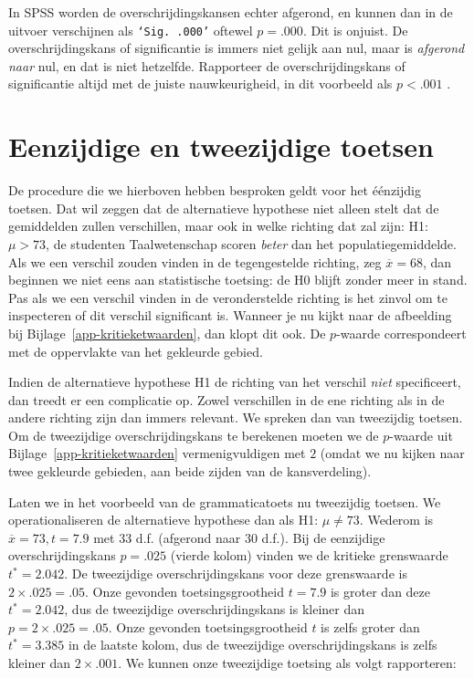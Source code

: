 \documentclass[
]{book}
\begin{document}
In SPSS worden de overschrijdingskansen echter afgerond, en kunnen dan
in de uitvoer verschijnen als \texttt{‘Sig.\ .000’} oftewel \(p=.000\). Dit is
onjuist. De overschrijdingskans of significantie is immers niet gelijk
aan nul, maar is \emph{afgerond naar} nul, en dat is niet hetzelfde.
Rapporteer de overschrijdingskans of significantie altijd met de juiste
nauwkeurigheid, in dit voorbeeld als \(p<.001\) \citep[zie ook][
p.125]{Wright03}.

\section{Eenzijdige en tweezijdige toetsen}\label{sec:ttoets-eenzijdigtweezijdig}

De procedure die we hierboven hebben besproken geldt voor het éénzijdig
toetsen. Dat wil zeggen dat de alternatieve hypothese niet alleen stelt
dat de gemiddelden zullen verschillen, maar ook in welke richting dat
zal zijn: H1: \(\mu >73\), de studenten Taalwetenschap scoren \emph{beter} dan
het populatiegemiddelde. Als we een verschil zouden vinden in de
tegengestelde richting, zeg \(\overline{x}=68\), dan beginnen we niet eens
aan statistische toetsing: de H0 blijft zonder meer in stand. Pas als we
een verschil vinden in de veronderstelde richting is het zinvol om te
inspecteren of dit verschil significant is. Wanneer je nu kijkt naar de
afbeelding bij Bijlage~\ref{app-kritieketwaarden}, dan klopt dit ook.
De \(p\)-waarde correspondeert met de oppervlakte van het gekleurde
gebied.

Indien de alternatieve hypothese H1 de richting van het verschil \emph{niet}
specificeert, dan treedt er een complicatie op. Zowel verschillen in de
ene richting als in de andere richting zijn dan immers relevant. We
spreken dan van tweezijdig toetsen. Om de tweezijdige
overschrijdingskans te berekenen moeten we de \(p\)-waarde uit
Bijlage~\ref{app-kritieketwaarden} vermenigvuldigen met \(2\) (omdat we
nu kijken naar twee gekleurde gebieden, aan beide zijden van de
kansverdeling).

Laten we in het voorbeeld van de grammaticatoets nu tweezijdig toetsen.
We operationaliseren de alternatieve hypothese dan als H1: \(\mu \ne 73\).
Wederom is \(\overline{x}=73, t=7.9\) met 33 d.f. (afgerond naar 30 d.f.).
Bij de eenzijdige overschrijdingskans \(p=.025\) (vierde kolom) vinden we
de kritieke grenswaarde \(t^*=2.042\). De tweezijdige overschrijdingskans
voor deze grenswaarde is \(2 \times .025 = .05\). Onze gevonden
toetsingsgrootheid \(t=7.9\) is groter dan deze \(t^*=2.042\), dus de
tweezijdige overschrijdingskans is kleiner dan \(p=2\times.025=.05\). Onze
gevonden toetsingsgrootheid \(t\) is zelfs groter dan \(t^*=3.385\) in de
laatste kolom, dus de tweezijdige overschrijdingskans is zelfs kleiner
dan \(2\times.001\). We kunnen onze tweezijdige toetsing als volgt
rapporteren:
\end{document}
